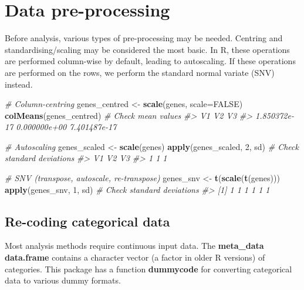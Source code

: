 \documentclass[
]{article}
\newenvironment{Shaded}{\begin{snugshade}}{\end{snugshade}}
\newcommand{\AttributeTok}[1]{\textcolor[rgb]{0.13,0.29,0.53}{#1}}
\newcommand{\CommentTok}[1]{\textcolor[rgb]{0.56,0.35,0.01}{\textit{#1}}}
\newcommand{\ConstantTok}[1]{\textcolor[rgb]{0.56,0.35,0.01}{#1}}
\newcommand{\DecValTok}[1]{\textcolor[rgb]{0.00,0.00,0.81}{#1}}
\newcommand{\FunctionTok}[1]{\textcolor[rgb]{0.13,0.29,0.53}{\textbf{#1}}}
\newcommand{\NormalTok}[1]{#1}
\newcommand{\OtherTok}[1]{\textcolor[rgb]{0.56,0.35,0.01}{#1}}
\begin{document}
\section{Data pre-processing}\label{data-pre-processing}

Before analysis, various types of pre-processing may be needed. Centring
and standardising/scaling may be considered the most basic. In R, these
operations are performed column-wise by default, leading to autoscaling.
If these operations are performed on the rows, we perform the standard
normal variate (SNV) instead.

\begin{Shaded}
\begin{Highlighting}[]
\CommentTok{\# Column{-}centring}
\NormalTok{genes\_centred }\OtherTok{\textless{}{-}} \FunctionTok{scale}\NormalTok{(genes, }\AttributeTok{scale=}\ConstantTok{FALSE}\NormalTok{)}
\FunctionTok{colMeans}\NormalTok{(genes\_centred) }\CommentTok{\# Check mean values}
\CommentTok{\#\textgreater{}           V1           V2           V3 }
\CommentTok{\#\textgreater{} 1.850372e{-}17 0.000000e+00 7.401487e{-}17}

\CommentTok{\# Autoscaling}
\NormalTok{genes\_scaled }\OtherTok{\textless{}{-}} \FunctionTok{scale}\NormalTok{(genes)}
\FunctionTok{apply}\NormalTok{(genes\_scaled, }\DecValTok{2}\NormalTok{, sd) }\CommentTok{\# Check standard deviations}
\CommentTok{\#\textgreater{} V1 V2 V3 }
\CommentTok{\#\textgreater{}  1  1  1}

\CommentTok{\# SNV (transpose, autoscale, re{-}transpose)}
\NormalTok{genes\_snv }\OtherTok{\textless{}{-}} \FunctionTok{t}\NormalTok{(}\FunctionTok{scale}\NormalTok{(}\FunctionTok{t}\NormalTok{(genes)))}
\FunctionTok{apply}\NormalTok{(genes\_snv, }\DecValTok{1}\NormalTok{, sd) }\CommentTok{\# Check standard deviations}
\CommentTok{\#\textgreater{} [1] 1 1 1 1 1 1}
\end{Highlighting}
\end{Shaded}

\subsection{Re-coding categorical
data}\label{re-coding-categorical-data}

Most analysis methods require continuous input data. The
\textbf{meta\_data} \textbf{data.frame} contains a character vector (a
factor in older R versions) of categories. This package has a function
\textbf{dummycode} for converting categorical data to various dummy
formats.
\end{document}

